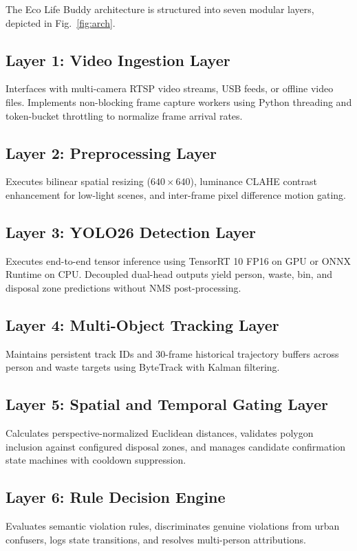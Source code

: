 \documentclass[conference]{IEEEtran}
\begin{document}
The Eco Life Buddy architecture is structured into seven modular layers, depicted in Fig.~\ref{fig:arch}.

\subsection{Layer 1: Video Ingestion Layer}
Interfaces with multi-camera RTSP video streams, USB feeds, or offline video files. Implements non-blocking frame capture workers using Python threading and token-bucket throttling to normalize frame arrival rates.

\subsection{Layer 2: Preprocessing Layer}
Executes bilinear spatial resizing ($640 \times 640$), luminance CLAHE contrast enhancement for low-light scenes, and inter-frame pixel difference motion gating.

\subsection{Layer 3: YOLO26 Detection Layer}
Executes end-to-end tensor inference using TensorRT 10 FP16 on GPU or ONNX Runtime on CPU. Decoupled dual-head outputs yield person, waste, bin, and disposal zone predictions without NMS post-processing.

\subsection{Layer 4: Multi-Object Tracking Layer}
Maintains persistent track IDs and 30-frame historical trajectory buffers across person and waste targets using ByteTrack with Kalman filtering.

\subsection{Layer 5: Spatial and Temporal Gating Layer}
Calculates perspective-normalized Euclidean distances, validates polygon inclusion against configured disposal zones, and manages candidate confirmation state machines with cooldown suppression.

\subsection{Layer 6: Rule Decision Engine}
Evaluates semantic violation rules, discriminates genuine violations from urban confusers, logs state transitions, and resolves multi-person attributions.
\end{document}

